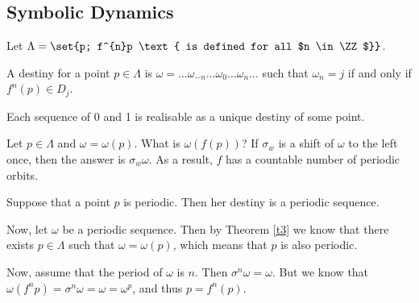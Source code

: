 \documentclass[11pt]{scrartcl}
\begin{document}
  \subsection{Symbolic Dynamics}

  Let $\Lambda = \set{p; f^{n}p \text{ is defined for all $n \in \ZZ$}}$.

  \begin{definition}
    A destiny for a point $p\in \Lambda$ is
    $\omega = \dots \omega_{-n}\dots \omega_{0}\dots \omega_{n}\dots$
    such that $\omega_{n} = j $ if and only if $f^{n}(p)\in D_{j}$.
  \end{definition}

  \begin{theorem}
    \label{t3}
    Each sequence of 0 and 1 is realisable as a unique destiny of some
    point.
  \end{theorem}

  Let $p\in \Lambda$ and $\omega = \omega(p)$. What is $\omega(f(p))$?
  If $\sigma_{w}$ is a shift of $\omega$ to the left once, then the
  answer is $\sigma_{w} \omega$. As a result, $f$ has a countable number
  of periodic orbits.

  \begin{note*}
    Suppose that a point $p$ is periodic. Then her destiny is a
    periodic sequence.

    Now, let $\omega$ be a periodic sequence. Then by Theorem \ref{t3}
    we know that there exists $p\in \Lambda$ such that
    $\omega = \omega(p)$, which means that $p$ is also periodic.

    Now, assume that the period of $\omega$ is $n$. Then
    $\sigma^{n}\omega = \omega$. But we know that
    $\omega(f^{n}p) = \sigma^{n}\omega = \omega = \omega^{p}$, and thus
    $p = f^{n}(p)$.
  \end{note*}
  
\end{document}
